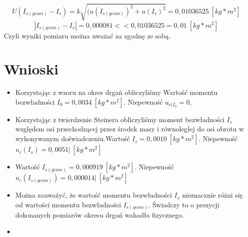 \documentclass[]{article}
\begin{document}
\[
U(I_{s(geom)} - I_{s}) = k \sqrt{(u(I_{s(geom)})^2 + u( I_{s})^2}
= 0,01036525\:[kg*m^2]
\]
\[
|I_{s(geom)} - I_{s}| = 0,000081 << 0,01036525 = 0,01\:[kg*m^2]
\]
Czyli wyniki pomiaru można uważać za zgodnę ze sobą.









\section{Wnioski}
\begin{itemize}
        \item Korzystając z wzoru na okres drgań obliczyliśmy Wartość momentu bezwładności \(I_{0}=0,0034\:[kg*m^2]\). Niepewność \(u_{c(I_{0}}=0,\)
        
		\item Korzystając z twierdzenie Steinera obliczyliśmy moment bezwładności \(I_{s}\) względem osi przechodzącej przez środek masy i równoległej do osi obrotu w wykonywanym doświadczeniu.\newline Wartość \(I_{s}= 0,0010\: [kg*m^2]\). Niepewność \(u_c(I_{s})=0,0051|\:[kg*m^2]\)
		\item  Wartość \(I_{s(geom)}= 0,000919\: [kg*m^2]\). Niepewność \(u_c(I_{s(geom)})=0,000014|\:[kg*m^2]\)
		\item  Można zauważyć, że wartość momentu bezwładności \(I_{s}\) nieznacznie różni się od wartości momentu bezwładności \(I_{s(geom)}\). Świadczy to o prezycji dokonanych pomiarów okresu drgań wahadła fizycznego.
		\item 
	\end{itemize}
\end{document}
